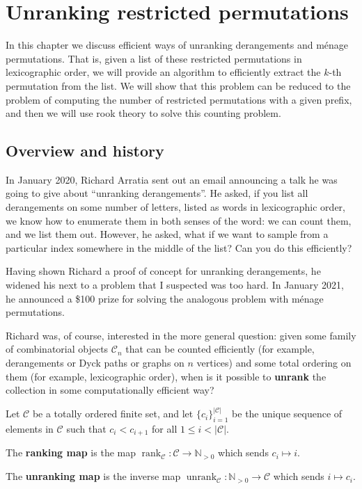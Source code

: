 \chapter{Unranking restricted permutations}
\label{cha:UnrankingMenage}

In this chapter we discuss efficient ways of unranking derangements and
m\'enage permutations.
That is, given a list of these restricted permutations in lexicographic order,
we will provide an algorithm to efficiently extract the $k$-th permutation from
the list.
We will show that this problem can be reduced to the problem of computing the
number of restricted permutations with a given prefix, and then we will
use rook theory to solve this counting problem.

\section{Overview and history}
In January 2020, Richard Arratia sent out an email announcing a talk he was
going to give about ``unranking derangements''. He asked, if you list all
derangements on some number of letters, listed as words in lexicographic
order, we know how to enumerate them in both senses of the word: we can count
them, and we list them out.
However, he asked, what if we want to sample from a particular index somewhere
in the middle of the list? Can you do this efficiently?

Having shown Richard a proof of concept for unranking derangements, he widened
his next to a problem that I suspected was too hard.
In January 2021, he announced a \$100 prize for solving the analogous problem
with m\'enage permutations.

Richard was, of course, interested in the more general question:
given some family of combinatorial objects $\mathcal{C}_n$ that can be counted
efficiently (for example, derangements or Dyck paths or graphs on $n$ vertices)
and some total ordering on them (for example, lexicographic order),
when is it possible to \textbf{unrank} the collection in some computationally
efficient way?

\begin{definition}
  Let $\mathcal C$ be a totally ordered finite set, and
  let $\{c_i\}_{i=1}^{|\mathcal C|}$ be the unique sequence of elements in
  $\mathcal{C}$ such that $c_i < c_{i+1}$ for all $1 \leq i < |\mathcal{C}|$.

  The \textbf{ranking map} is the map
  $\operatorname{rank}_{\mathcal{C}} \colon \mathcal{C} \rightarrow \mathbb N_{>0}$
  which sends $c_i \mapsto i$.

  The \textbf{unranking map} is the inverse map
  $\operatorname{unrank}_{\mathcal{C}} \colon \mathbb N_{>0} \rightarrow \mathcal{C}$
  which sends $i \mapsto c_i$.
\end{definition}

